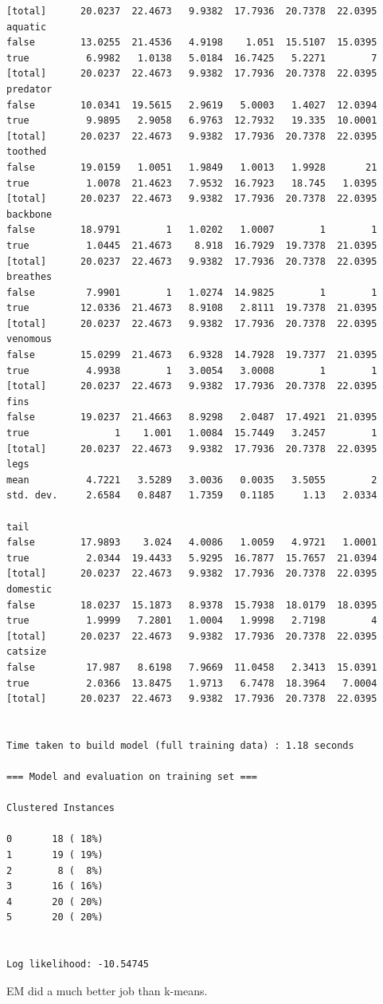 \documentclass[11pt,a4paper]{article}
\begin{document}
\begin{verbatim}
[total]      20.0237  22.4673   9.9382  17.7936  20.7378  22.0395
aquatic
false        13.0255  21.4536   4.9198    1.051  15.5107  15.0395
true          6.9982   1.0138   5.0184  16.7425   5.2271        7
[total]      20.0237  22.4673   9.9382  17.7936  20.7378  22.0395
predator
false        10.0341  19.5615   2.9619   5.0003   1.4027  12.0394
true          9.9895   2.9058   6.9763  12.7932   19.335  10.0001
[total]      20.0237  22.4673   9.9382  17.7936  20.7378  22.0395
toothed
false        19.0159   1.0051   1.9849   1.0013   1.9928       21
true          1.0078  21.4623   7.9532  16.7923   18.745   1.0395
[total]      20.0237  22.4673   9.9382  17.7936  20.7378  22.0395
backbone
false        18.9791        1   1.0202   1.0007        1        1
true          1.0445  21.4673    8.918  16.7929  19.7378  21.0395
[total]      20.0237  22.4673   9.9382  17.7936  20.7378  22.0395
breathes
false         7.9901        1   1.0274  14.9825        1        1
true         12.0336  21.4673   8.9108   2.8111  19.7378  21.0395
[total]      20.0237  22.4673   9.9382  17.7936  20.7378  22.0395
venomous
false        15.0299  21.4673   6.9328  14.7928  19.7377  21.0395
true          4.9938        1   3.0054   3.0008        1        1
[total]      20.0237  22.4673   9.9382  17.7936  20.7378  22.0395
fins
false        19.0237  21.4663   8.9298   2.0487  17.4921  21.0395
true               1    1.001   1.0084  15.7449   3.2457        1
[total]      20.0237  22.4673   9.9382  17.7936  20.7378  22.0395
legs
mean          4.7221   3.5289   3.0036   0.0035   3.5055        2
std. dev.     2.6584   0.8487   1.7359   0.1185     1.13   2.0334

tail
false        17.9893    3.024   4.0086   1.0059   4.9721   1.0001
true          2.0344  19.4433   5.9295  16.7877  15.7657  21.0394
[total]      20.0237  22.4673   9.9382  17.7936  20.7378  22.0395
domestic
false        18.0237  15.1873   8.9378  15.7938  18.0179  18.0395
true          1.9999   7.2801   1.0004   1.9998   2.7198        4
[total]      20.0237  22.4673   9.9382  17.7936  20.7378  22.0395
catsize
false         17.987   8.6198   7.9669  11.0458   2.3413  15.0391
true          2.0366  13.8475   1.9713   6.7478  18.3964   7.0004
[total]      20.0237  22.4673   9.9382  17.7936  20.7378  22.0395


Time taken to build model (full training data) : 1.18 seconds

=== Model and evaluation on training set ===

Clustered Instances

0       18 ( 18%)
1       19 ( 19%)
2        8 (  8%)
3       16 ( 16%)
4       20 ( 20%)
5       20 ( 20%)


Log likelihood: -10.54745
\end{verbatim}

   EM did a much better job than k-means.
\end{document}

